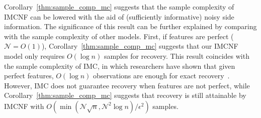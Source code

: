 \documentclass[twoside,11pt]{article}
\def\nmax{{\mathcal N}}
\def\realL{L_0}
\begin{document}

Corollary~\ref{thm:sample_comp_mc} suggests that the sample complexity of IMCNF can be
lowered with the aid of (sufficiently informative) noisy side information.
The significance of this result can be further explained
by comparing with the sample complexity of other models.
First, if features are perfect ($\nmax = O(1)$),  Corollary~\ref{thm:sample_comp_mc} suggests
that our IMCNF model only requires $O(\log{n})$ samples for recovery.
This result coincides with the sample complexity of IMC,
in which researchers have shown that
given perfect features, $O(\log{n})$ observations are enough for exact recovery~\citep{Xu13a, Zhong15a}.
However, IMC %
does not guarantee recovery when features
are not perfect, while Corollary~\ref{thm:sample_comp_mc} suggests that recovery
is still attainable by IMCNF with
$O(\min(\nmax\sqrt{n}, \nmax^2\log{n})/\epsilon^2)$ samples.
\end{document}
